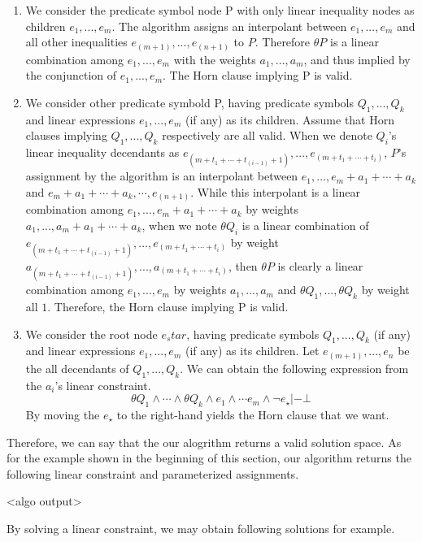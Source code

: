 \documentclass{llncs}
\begin{document}
\begin{enumerate}
\item We consider the predicate symbol node P with only linear inequality nodes as children $e_1,...,e_m$. The algorithm assigns an interpolant between $e_1,...,e_m$ and all other inequalities $e_(m+1),...,e_(n+1)$ to $P$. Therefore $\theta P$ is a linear combination among $e_1,...,e_m$ with the weights $a_1,...,a_m$, and thus implied by the conjunction of $e_1,...,e_m$. The Horn clause implying P is valid.

\item We consider other predicate symbold P, having predicate symbols $Q_1,...,Q_k$ and linear expressions $e_1,...,e_m$ (if any) as its children. Assume that Horn clauses implying $Q_1,...,Q_k$ respectively are all valid. When we denote $Q_i$'s linear inequality decendants as $e_(m+t_1+\cdots+t_(i-1)+1),...,e_(m+t_1+\cdots+t_i)$, $P$'s assignment by the algorithm is an interpolant between $e_1,...,e_m+a_1+\cdots+a_k$ and $e_m+a_1+\cdots+a_k,\cdots,e_(n+1)$. While this interpolant is a linear combination among $e_1,...,e_m+a_1+\cdots+a_k$ by weights $a_1,...,a_m+a_1+\cdots+a_k$, when we note $\theta Q_i$ is a linear combination of $e_(m+t_1+\cdots+t_(i-1)+1),...,e_(m+t_1+\cdots+t_i)$ by weight $a_(m+t_1+\cdots+t_(i-1)+1),...,a_(m+t_1+\cdots+t_i)$, then $\theta P$ is clearly a linear combination among $e_1,...,e_m$ by weights $a_1,...,a_m$ and $\theta Q_1,...,\theta Q_k$ by weight all $1$. Therefore, the Horn clause implying P is valid.

\item We consider the root node $e_star$, having predicate symbols $Q_1,...,Q_k$ (if any) and linear expressions $e_1,...,e_m$ (if any) as its children. Let $e_(m+1),...,e_n$ be the all decendants of $Q_1,...,Q_k$. We can obtain the following expression from the $a_i$'s linear constraint.
$$ \theta Q_1 \wedge \cdots \wedge \theta Q_k \wedge e_1 \wedge \cdots e_m \wedge \neg e_\star |- \bot$$
By moving the $e_\star$ to the right-hand yields the Horn clause that we want.
\end{enumerate}


Therefore, we can say that the our alogrithm returns a valid solution space. As for the example shown in the beginning of this section, our algorithm returns the following linear constraint and parameterized assignments.

<algo output>

By solving a linear constraint, we may obtain following solutions for example.
\end{document}
